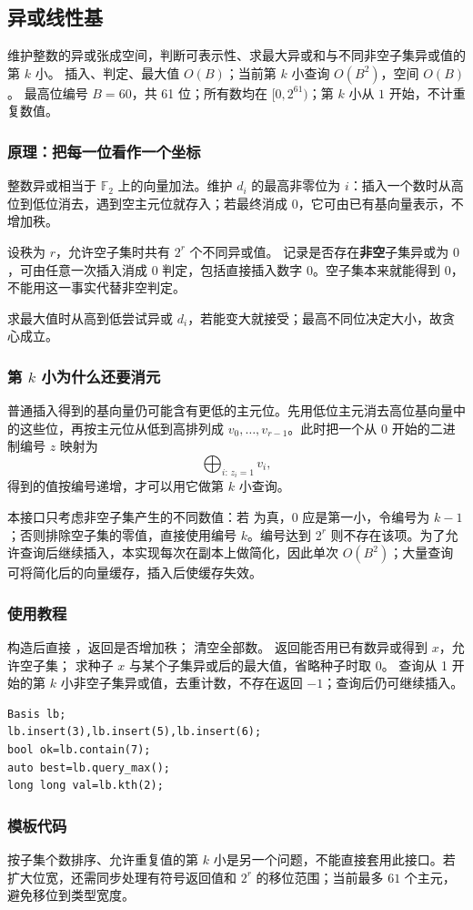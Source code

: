 \subsection{异或线性基}
\label{algo:linear-basis}
\AlgorithmInfo
    {维护整数的异或张成空间，判断可表示性、求最大异或和与不同非空子集异或值的第 $k$ 小。}
    {插入、判定、最大值 $O(B)$；当前第 $k$ 小查询 $O(B^2)$，空间 $O(B)$。}
    {最高位编号 $B=60$，共 61 位；所有数均在 $[0,2^{61})$；第 $k$ 小从 $1$ 开始，不计重复数值。}

\subsubsection*{原理：把每一位看作一个坐标}
整数异或相当于 $\mathbb F_2$ 上的向量加法。维护 $d_i$ 的最高非零位为 $i$：插入一个数时从高位到低位消去，遇到空主元位就存入；若最终消成 $0$，它可由已有基向量表示，不增加秩。

设秩为 $r$，允许空子集时共有 $2^r$ 个不同异或值。 记录是否存在\textbf{非空}子集异或为 $0$，可由任意一次插入消成 $0$ 判定，包括直接插入数字 $0$。空子集本来就能得到 $0$，不能用这一事实代替非空判定。

求最大值时从高到低尝试异或 $d_i$，若能变大就接受；最高不同位决定大小，故贪心成立。

\subsubsection*{第 $k$ 小为什么还要消元}
普通插入得到的基向量仍可能含有更低的主元位。先用低位主元消去高位基向量中的这些位，再按主元位从低到高排列成 $v_0,\ldots,v_{r-1}$。此时把一个从 $0$ 开始的二进制编号 $z$ 映射为
\[
    \bigoplus_{i:\,z_i=1}v_i,
\]
得到的值按编号递增，才可以用它做第 $k$ 小查询。

本接口只考虑非空子集产生的不同数值：若  为真，$0$ 应是第一小，令编号为 $k-1$；否则排除空子集的零值，直接使用编号 $k$。编号达到 $2^r$ 则不存在该项。为了允许查询后继续插入，本实现每次在副本上做简化，因此单次 $O(B^2)$；大量查询可将简化后的向量缓存，插入后使缓存失效。

\subsubsection*{使用教程}
构造后直接 ，返回是否增加秩； 清空全部数。 返回能否用已有数异或得到 $x$，允许空子集； 求种子 $x$ 与某个子集异或后的最大值，省略种子时取 0。 查询从 1 开始的第 $k$ 小非空子集异或值，去重计数，不存在返回 $-1$；查询后仍可继续插入。
\begin{lstlisting}[style=mtycpp,numbers=none]
Basis lb;
lb.insert(3),lb.insert(5),lb.insert(6);
bool ok=lb.contain(7);
auto best=lb.query_max();
long long val=lb.kth(2);
\end{lstlisting}

\subsubsection*{模板代码}

按子集个数排序、允许重复值的第 $k$ 小是另一个问题，不能直接套用此接口。若扩大位宽，还需同步处理有符号返回值和 $2^r$ 的移位范围；当前最多 $61$ 个主元，避免移位到类型宽度。
